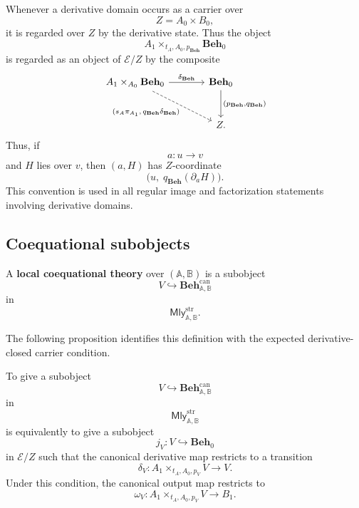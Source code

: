 Whenever a derivative domain occurs as a carrier over
\[
    Z=A_0\times B_0,
\]
it is regarded over \(Z\) by the derivative state. Thus the object
\[
    A_1\times_{t_A,A_0,p_{\mathbf{Beh}}}\mathbf{Beh}_0
\]
is regarded as an object of \(\mathcal E/Z\) by the composite
\[
\begin{tikzcd}[column sep=large, row sep=large]
    A_1\times_{A_0}\mathbf{Beh}_0
        \arrow[r, "\delta_{\mathbf{Beh}}"]
        \arrow[dr, dashed, "{(s_A\pi_{A_1},\,q_{\mathbf{Beh}}\delta_{\mathbf{Beh}})}"']
    &
    \mathbf{Beh}_0
        \arrow[d, "{(p_{\mathbf{Beh}},q_{\mathbf{Beh}})}"]
    \\
    &
    Z .
\end{tikzcd}
\]
Thus, if
\[
    a:u\to v
\]
and \(H\) lies over \(v\), then \((a,H)\) has \(Z\)-coordinate
\[
    \bigl(u,\;q_{\mathbf{Beh}}(\partial_aH)\bigr).
\]
This convention is used in all regular image and factorization statements
involving derivative domains.

\subsection{Coequational subobjects}
\label{subsec:coequational-subobjects}

\begin{definition}
\label{def:local-coequational-theory}
    A \textbf{local coequational theory} over \((\mathbb A,\mathbb B)\) is a
    subobject
    \[
        V\hookrightarrow \mathbf{Beh}^{\mathrm{can}}_{\mathbb A,\mathbb B}
    \]
    in
    \[
        \mathsf{Mly}^{\mathrm{str}}_{\mathbb A,\mathbb B}.
    \]
\end{definition}

The following proposition identifies this definition with the expected
derivative-closed carrier condition.

\begin{proposition}
\label{prop:subobjects-canonical-behaviour-machine}
    To give a subobject
    \[
        V\hookrightarrow \mathbf{Beh}^{\mathrm{can}}_{\mathbb A,\mathbb B}
    \]
    in
    \[
        \mathsf{Mly}^{\mathrm{str}}_{\mathbb A,\mathbb B}
    \]
    is equivalently to give a subobject
    \[
        j_V:V\hookrightarrow\mathbf{Beh}_0
    \]
    in \(\mathcal E/Z\) such that the canonical derivative map restricts to a
    transition
    \[
        \delta_V:
        A_1\times_{t_A,A_0,p_V}V\to V.
    \]
    Under this condition, the canonical output map restricts to
    \[
        \omega_V:
        A_1\times_{t_A,A_0,p_V}V\to B_1.
    \]
\end{proposition}

